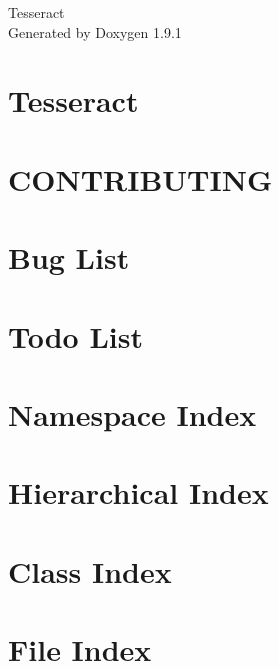 \let\mypdfximage\pdfximage\def\pdfximage{\immediate\mypdfximage}\documentclass[twoside]{book}
\newcommand{\+}{\discretionary{\mbox{\scriptsize$\hookleftarrow$}}{}{}}
\newcommand{\clearemptydoublepage}{%
  \newpage{\pagestyle{empty}\cleardoublepage}%
}
\begin{document}
\raggedbottom

\hypersetup{pageanchor=false,
             bookmarksnumbered=true,
             pdfencoding=unicode
            }
\begin{titlepage}
\vspace*{7cm}
\begin{center}%
{\Large Tesseract }\\
\vspace*{1cm}
{\large Generated by Doxygen 1.9.1}\\
\end{center}
\end{titlepage}
\clearemptydoublepage
{}
\tableofcontents
\clearemptydoublepage
{}
\hypersetup{pageanchor=true}

\chapter{Tesseract}
\label{index}\hypertarget{index}{}
\chapter{CONTRIBUTING}
\label{md_CONTRIBUTING}

\chapter{Bug List}
\label{bug}

\chapter{Todo List}
\label{todo}

\chapter{Namespace Index}

\chapter{Hierarchical Index}

\chapter{Class Index}

\chapter{File Index}

\end{document}
